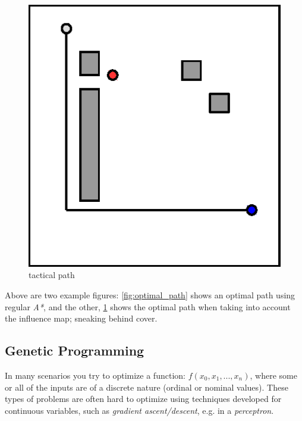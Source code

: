 \documentclass[a4paper, twocolumn]{article}
\begin{document}
\begin{minipage}{\linewidth}
	\begin{minipage}{0.45\linewidth}
	\begin{figure}[H]
        \centering
		\includegraphics[width=\linewidth]{share/good.eps}
		\caption{tactical path}
		\label{fig:smart_path}
	\end{figure}
	\end{minipage}
\end{minipage}

\vspace{0.5em}

    Above are two example figures: \cref{fig:optimal_path} shows an optimal path using regular \emph{A*}, and the other, \cref{fig:smart_path} shows the optimal path when taking into account the influence map; sneaking behind cover.
	
	\subsection{Genetic Programming} \label{sec:genetic_programming}

    In many scenarios you try to optimize a function: \(f(x_0,x_1,...,x_n)\), where some or all of the inputs are of a discrete nature (ordinal or nominal values). These types of problems are often hard to optimize using techniques developed for continuous variables, such as \emph{gradient ascent/descent}, e.g. in a \emph{perceptron}.
\end{document}
